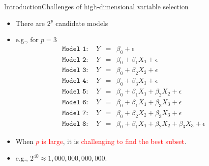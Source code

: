 \documentclass[citecolor=blue,10pt]{beamer}
\newcommand{\0} {\mbox{\boldmath$0$}}
\begin{document}
\begin{frame}{Introduction}{Challenges of high-dimensional variable selection}
\begin{itemize}\itemsep=3mm
\item There are $2^p$ candidate models\\
\item[] e.g., for $p=3$
{\footnotesize
\begin{eqnarray*}
\texttt{Model 1}:\quad Y&=&\beta_0+\epsilon\\
\texttt{Model 2}:\quad Y&=&\beta_0+\beta_1X_1+\epsilon\\
\texttt{Model 3}:\quad Y&=&\beta_0+\beta_2X_2+\epsilon\\
\texttt{Model 4}:\quad Y&=&\beta_0+\beta_3X_3+\epsilon\\
\texttt{Model 5}:\quad Y&=&\beta_0+\beta_1X_1+\beta_2X_2+\epsilon\\
\texttt{Model 6}:\quad Y&=&\beta_0+\beta_1X_1+\beta_3X_3+\epsilon\\
\texttt{Model 7}:\quad Y&=&\beta_0+\beta_2X_2+\beta_3X_3+\epsilon\\
\texttt{Model 8}:\quad Y&=&\beta_0+\beta_1X_1+\beta_2X_2+\beta_3X_3+\epsilon
\end{eqnarray*}}\pause
\item When \textcolor{red}{$p$ is large}, it is \textcolor{red}{challenging to find the best subset}.
\item[]  e.g., $2^{40}\approx 1,000,000,000,000$.
\end{itemize}
\end{frame}
\end{document}

